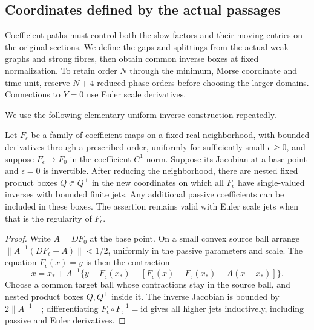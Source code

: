 \subsection{Coordinates defined by the actual passages}
\label{rw:coordinates}

Coefficient paths must control both the slow factors and their moving
entries on the original sections. We define the gaps and splittings
from the actual weak graphs and strong fibres, then obtain common
inverse boxes at fixed normalization. To retain order $N$ through the
minimum, Morse coordinate and time unit, reserve $N+4$ reduced-phase
orders before choosing the larger domains. Connections to $Y=0$ use
Euler scale derivatives.

We use the following elementary uniform inverse construction repeatedly.
\begin{lemma}\label{rw:coordinates:inverse-box}
Let $F_\epsilon$ be a family of coefficient maps on a fixed real
neighborhood, with bounded derivatives through a prescribed order,
uniformly for sufficiently small $\epsilon\ge0$, and suppose
$F_\epsilon\to F_0$ in the coefficient $C^1$ norm. Suppose its Jacobian
at a base point and $\epsilon=0$ is invertible. After reducing the
neighborhood, there are nested fixed product boxes $Q\Subset Q^+$ in
the new coordinates on which all $F_\epsilon$ have single-valued
inverses with bounded finite jets. Any additional passive coefficients
can be included in these boxes. The assertion remains valid with Euler
scale jets when that is the regularity of $F_\epsilon$.
\end{lemma}
\begin{proof}
Write $A=DF_0$ at the base point. On a small convex source ball arrange
$\|A^{-1}(DF_\epsilon-A)\|<1/2$, uniformly in the passive parameters
and scale. The equation $F_\epsilon(x)=y$ is then the contraction
\[
 x=x_*+A^{-1}\{y-F_\epsilon(x_*)
              -[F_\epsilon(x)-F_\epsilon(x_*)-A(x-x_*)]\}.
\]
Choose a common target ball whose contractions stay in the source
ball, and nested product boxes $Q,Q^+$ inside it. The inverse
Jacobian is bounded by $2\|A^{-1}\|$; differentiating
$F_\epsilon\circ F_\epsilon^{-1}=\mathrm{id}$ gives all higher
jets inductively, including passive and Euler derivatives.
\end{proof}

